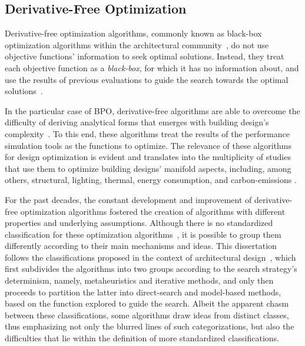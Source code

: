 	\subsection{Derivative-Free Optimization}
	\label{sec:dfo}
	 
	Derivative-free optimization algorithms, commonly known as black-box optimization algorithms within the architectural community~\cite{Wortmann2016BBO}, do not use objective functions' information to seek optimal solutions. Instead, they treat each objective function as a \textit{black-box}, for which it has no information about, and use the results of previous evaluations to guide the search towards the optimal solutions~\cite{Rios2013}.
	 
	In the particular case of \ac{BPO}, derivative-free algorithms are able to overcome the difficulty of deriving analytical forms that emerges with building design's complexity~\cite{Machairas2014}. To this end, these algorithms treat the results of the performance simulation tools as the functions to optimize. The relevance of these algorithms for design optimization is evident and translates into the multiplicity of studies that use them to optimize building designs' manifold aspects, including, among others, structural, lighting, thermal, energy consumption, and carbon-emissions \cite{Evins2011,Evins2012MOO,Evins2013, Wortmann2015AdvSBO,Wortmann2016BBO,Wortmann2017GABESTCHOICE,Wortmann2017Opossum,Waibel2018}. 
	
	For the past decades, the constant development and improvement of derivative-free optimization algorithms fostered the creation of algorithms with different properties and underlying assumptions. Although there is no standardized classification for these optimization algorithms~\cite{Rios2013, Wortmann2017ADO}, it is possible to group them differently according to their main mechanisms and ideas. This dissertation follows the classifications proposed in the context of architectural design~\cite{Wortmann2015AdvSBO}, which first subdivides the algorithms into two groups according to the search strategy's determinism, namely, metaheuristics and iterative methods, and only then proceeds to partition the latter into direct-search and model-based methods, based on the function explored to guide the search. Albeit the apparent chasm between these classifications, some algorithms draw ideas from distinct classes, thus emphasizing not only the blurred lines of such categorizations, but also the difficulties that lie within the definition of more standardized classifications. 
	
